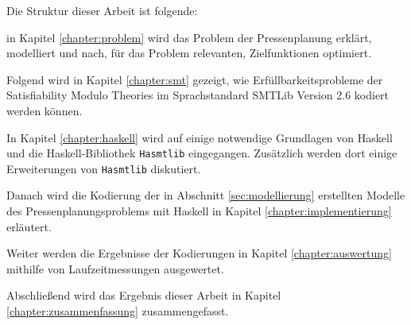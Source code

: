 
Die Struktur dieser Arbeit ist folgende:

in Kapitel \ref{chapter:problem} wird das Problem der Pressenplanung erklärt, modelliert und nach, für das Problem relevanten, Zielfunktionen optimiert.

Folgend wird in Kapitel \ref{chapter:smt} gezeigt, wie Erfüllbarkeitsprobleme der Satisfiability Modulo Theories im Sprachstandard SMTLib Version 2.6 kodiert werden können.

In Kapitel \ref{chapter:haskell} wird auf einige notwendige Grundlagen von Haskell und die Haskell-Bibliothek \texttt{Hasmtlib} eingegangen.
Zusätzlich werden dort einige Erweiterungen von \texttt{Hasmtlib} diskutiert.

Danach wird die Kodierung der in Abschnitt \ref{sec:modellierung} erstellten Modelle des Pressenplanungsproblems mit Haskell
in Kapitel \ref{chapter:implementierung} erläutert.

Weiter werden die Ergebnisse der Kodierungen in Kapitel \ref{chapter:auswertung} mithilfe von Laufzeitmessungen ausgewertet.

Abschließend wird das Ergebnis dieser Arbeit in Kapitel \ref{chapter:zusammenfassung} zusammengefasst.